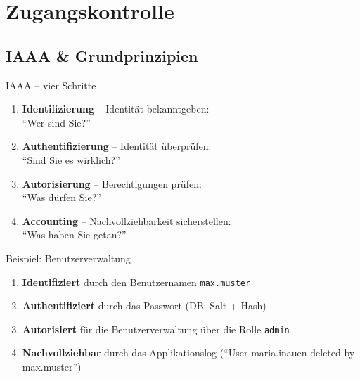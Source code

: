 \documentclass[a4paper, fontsize=7pt]{scrartcl}
\begin{document}
\section{Zugangskontrolle}

\subsection{IAAA \& Grundprinzipien}

\begin{mainbox}{IAAA -- vier Schritte}
\begin{enumerate}
    \item \textbf{Identifizierung} -- Identität bekanntgeben:\\
          ``Wer sind Sie?''
    \item \textbf{Authentifizierung} -- Identität überprüfen:\\
          ``Sind Sie es wirklich?''
    \item \textbf{Autorisierung} -- Berechtigungen prüfen:\\
          ``Was dürfen Sie?''
    \item \textbf{Accounting} -- Nachvollziehbarkeit sicherstellen:\\
          ``Was haben Sie getan?''
\end{enumerate}
\end{mainbox}

\begin{subbox}{Beispiel: Benutzerverwaltung}
\begin{enumerate}
    \item \textbf{Identifiziert} durch den Benutzernamen \texttt{max.muster}
    \item \textbf{Authentifiziert} durch das Passwort (DB: Salt + Hash)
    \item \textbf{Autorisiert} für die Benutzerverwaltung über die Rolle
          \texttt{admin}
    \item \textbf{Nachvollziehbar} durch das Applikationslog
          (``User maria.inauen deleted by max.muster'')
\end{enumerate}
\end{subbox}
\end{document}
